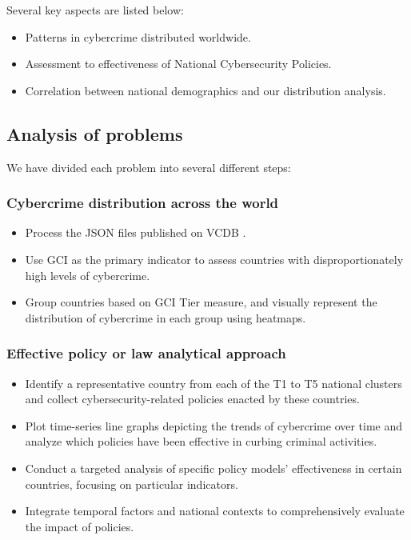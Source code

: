 	Several key aspects are listed below:
	\begin{itemize}
		\item Patterns in cybercrime distributed worldwide.
		\item Assessment to effectiveness of National Cybersecurity Policies.
		\item Correlation between national demographics and our distribution analysis.
	\end{itemize}
\subsection{Analysis of problems}\label{subsec:analysis-of-problems} %
	We have divided each problem into several different steps:
	\subsubsection{Cybercrime distribution across the world} %
		\begin{itemize}
			\item Process the JSON files published on VCDB .
			\item Use GCI as the primary indicator to assess countries with disproportionately high levels of cybercrime.
			\item Group countries based on GCI Tier measure, and
				visually represent the distribution of cybercrime in each group using heatmaps.
		\end{itemize}
	\subsubsection{Effective policy or law analytical approach} %
		\begin{itemize}
			\item Identify a representative country from each of the T1 to T5 national clusters and
				collect cybersecurity-related policies enacted by these countries.
			\item Plot time-series line graphs depicting the trends of cybercrime over time and
				analyze which policies have been effective in curbing criminal activities.
			\item Conduct a targeted analysis of specific policy models' effectiveness in certain countries,
				focusing on particular indicators.
			\item Integrate temporal factors and national contexts to comprehensively evaluate the impact of policies.
		\end{itemize}
